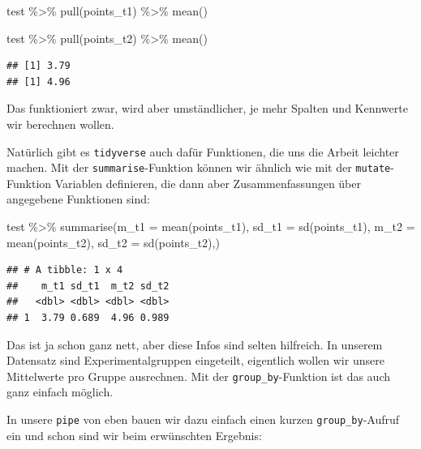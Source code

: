 \documentclass[
]{book}
\newenvironment{Shaded}{\begin{snugshade}}{\end{snugshade}}
\newcommand{\AttributeTok}[1]{\textcolor[rgb]{0.77,0.63,0.00}{#1}}
\newcommand{\FunctionTok}[1]{\textcolor[rgb]{0.00,0.00,0.00}{#1}}
\newcommand{\NormalTok}[1]{#1}
\newcommand{\SpecialCharTok}[1]{\textcolor[rgb]{0.00,0.00,0.00}{#1}}
\begin{document}
\begin{Shaded}
\begin{Highlighting}[]
\NormalTok{test }\SpecialCharTok{\%\textgreater{}\%} 
  \FunctionTok{pull}\NormalTok{(points\_t1) }\SpecialCharTok{\%\textgreater{}\%} 
  \FunctionTok{mean}\NormalTok{()}

\NormalTok{test }\SpecialCharTok{\%\textgreater{}\%} 
  \FunctionTok{pull}\NormalTok{(points\_t2) }\SpecialCharTok{\%\textgreater{}\%} 
  \FunctionTok{mean}\NormalTok{()}
\end{Highlighting}
\end{Shaded}

\begin{verbatim}
## [1] 3.79
## [1] 4.96
\end{verbatim}

Das funktioniert zwar, wird aber umständlicher, je mehr Spalten und Kennwerte wir berechnen wollen.

Natürlich gibt es \texttt{tidyverse} auch dafür Funktionen, die uns die Arbeit leichter machen. Mit der \texttt{summarise}-Funktion können wir ähnlich wie mit der \texttt{mutate}-Funktion Variablen definieren, die dann aber Zusammenfassungen über angegebene Funktionen sind:

\begin{Shaded}
\begin{Highlighting}[]
\NormalTok{test }\SpecialCharTok{\%\textgreater{}\%}
  \FunctionTok{summarise}\NormalTok{(}\AttributeTok{m\_t1 =} \FunctionTok{mean}\NormalTok{(points\_t1),}
            \AttributeTok{sd\_t1 =} \FunctionTok{sd}\NormalTok{(points\_t1),}
            \AttributeTok{m\_t2 =} \FunctionTok{mean}\NormalTok{(points\_t2),}
            \AttributeTok{sd\_t2 =} \FunctionTok{sd}\NormalTok{(points\_t2),)}
\end{Highlighting}
\end{Shaded}

\begin{verbatim}
## # A tibble: 1 x 4
##    m_t1 sd_t1  m_t2 sd_t2
##   <dbl> <dbl> <dbl> <dbl>
## 1  3.79 0.689  4.96 0.989
\end{verbatim}

Das ist ja schon ganz nett, aber diese Infos sind selten hilfreich. In unserem Datensatz sind Experimentalgruppen eingeteilt, eigentlich wollen wir unsere Mittelwerte pro Gruppe ausrechnen. Mit der \texttt{group\_by}-Funktion ist das auch ganz einfach möglich.

In unsere \texttt{pipe} von eben bauen wir dazu einfach einen kurzen \texttt{group\_by}-Aufruf ein und schon sind wir beim erwünschten Ergebnis:
\end{document}
